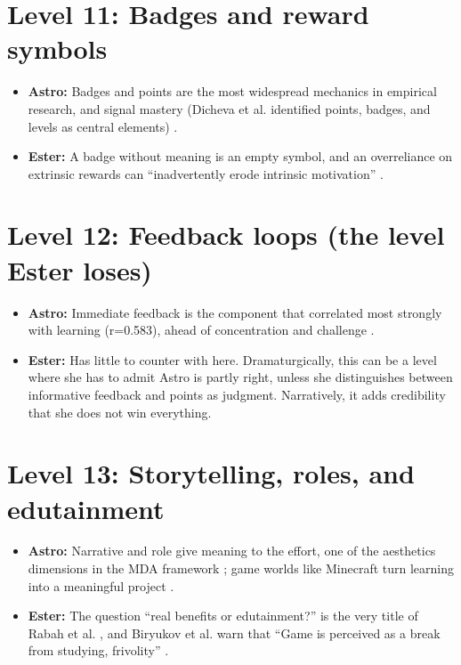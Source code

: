 \documentclass{article}
\begin{document}
\section{Level 11: Badges and reward symbols}
\begin{itemize}
  \item \textbf{Astro:} Badges and points are the most widespread mechanics in empirical research, and signal mastery (Dicheva et al. identified points, badges, and levels as central elements) \cite{dicheva2015}.
  \item \textbf{Ester:} A badge without meaning is an empty symbol, and an overreliance on extrinsic rewards can ``inadvertently erode intrinsic motivation'' \cite{christopoulos2023}.
\end{itemize}

\section{Level 12: Feedback loops (the level Ester loses)}
\begin{itemize}
  \item \textbf{Astro:} Immediate feedback is the component that correlated most strongly with learning (r=0.583), ahead of concentration and challenge \cite{khoshnoodifar2023}.
  \item \textbf{Ester:} Has little to counter with here. Dramaturgically, this can be a level where she has to admit Astro is partly right, unless she distinguishes between informative feedback and points as judgment. Narratively, it adds credibility that she does not win everything.
\end{itemize}

\section{Level 13: Storytelling, roles, and edutainment}
\begin{itemize}
  \item \textbf{Astro:} Narrative and role give meaning to the effort, one of the aesthetics dimensions in the MDA framework \cite{christopoulos2023}; game worlds like Minecraft turn learning into a meaningful project \cite{steinbeiss2017}.
  \item \textbf{Ester:} The question ``real benefits or edutainment?'' is the very title of Rabah et al. \cite{rabah2018}, and Biryukov et al. warn that ``Game is perceived as a break from studying, frivolity'' \cite{biryukov2021}.
\end{itemize}
\end{document}

